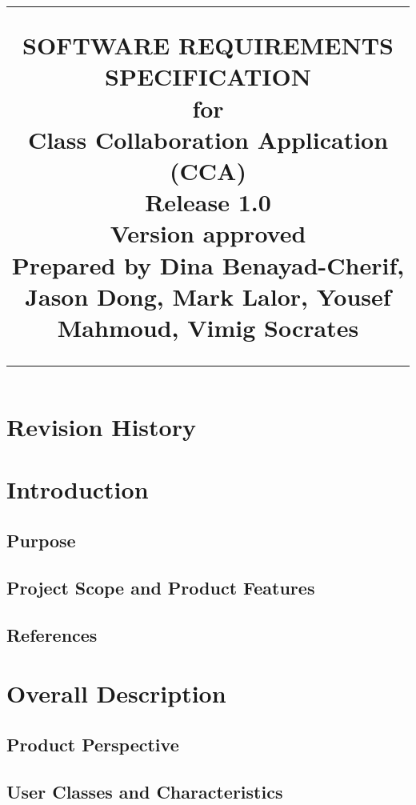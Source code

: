 \documentclass{scrreprt}
\title{%
\flushright
\rule{16cm}{5pt}\vskip1cm
\Huge{SOFTWARE REQUIREMENTS\\ SPECIFICATION}\\
\vspace{2cm}
for\\
\vspace{2cm}
Class Collaboration Application (CCA)\\
\vspace{2cm}
\LARGE{Release 1.0\\}
\vspace{2cm}
\LARGE{Version \myversion approved\\}
\vspace{2cm}
Prepared by Dina Benayad-Cherif, Jason Dong, Mark Lalor, Yousef Mahmoud, Vimig Socrates\\
\vfill
\rule{16cm}{5pt}
}
\date{}
\begin{document}
\maketitle
\tableofcontents
\chapter*{Revision History}
\chapter{Introduction}
\section{Purpose}
\section{Project Scope and Product Features}
\section{References}
\chapter{Overall Description}
\section{Product Perspective}
\section{User Classes and Characteristics}
\end{document}
